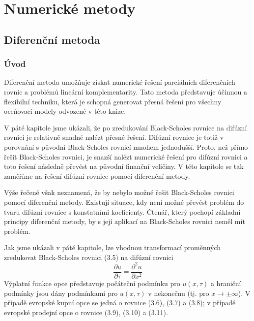 \documentclass[a4paper]{book}
\begin{document}
\part{Numerické metody}

\chapter{Diferenční metoda}

\section{Úvod}

Diferenční metoda umožňuje získat numerické řešení parciálních diferenčních rovnic a problémů lineární komplementarity. Tato metoda představuje účinnou a flexibilní techniku, která je schopná generovat přesná řešení pro všechny oceňovací modely odvozené v této knize.

V páté kapitole jsme ukázali, že po zredukování Black-Scholes rovnice na difúzní rovnici je relativně snadné nalézt přesné řešení. Difúzní rovnice je totiž v porovnání s původní Black-Scholes rovnicí mnohem jednodušší. Proto, než přímo řešit Black-Scholes rovnici, je snazší nalézt numerické řešení pro difúzní rovnici a toto řešení následně převést na původní finanční veličiny. V této kapitole se tak zaměříme na řešení difúzní rovnice pomocí diferenční metody.

Výše řečené však neznamená, že by nebylo možné řešit Black-Scholes rovnici pomocí diferenční metody. Existují situace, kdy není možné převést problém do tvaru difúzní rovnice s konstatními koeficienty. Čtenář, který pochopí základní principy diferenční metody, by s její aplikací na Black-Scholes rovnici neměl mít problém.

Jak jsme ukázali v páté kapitole, lze vhodnou transformací proměnných zredukovat Black-Scholes rovnici (3.5) na difúzní rovnici
\begin{equation*}
\frac{\partial u}{\partial \tau} = \frac{\partial^2 u}{\partial x^2}
\end{equation*}
Výplatní funkce opce představuje počáteční podmínku pro $u(x, \tau)$ a hraniční podmínky jsou dány podmínkami pro $u(x, \tau)$ v nekonečnu (tj. pro $x \rightarrow \pm \infty$). V případě evropské kupní opce se jedná o rovnice (3.6), (3.7) a (3.8); v případě evropské prodejní opce o rovnice (3.9), (3.10) a (3.11).
\end{document}
